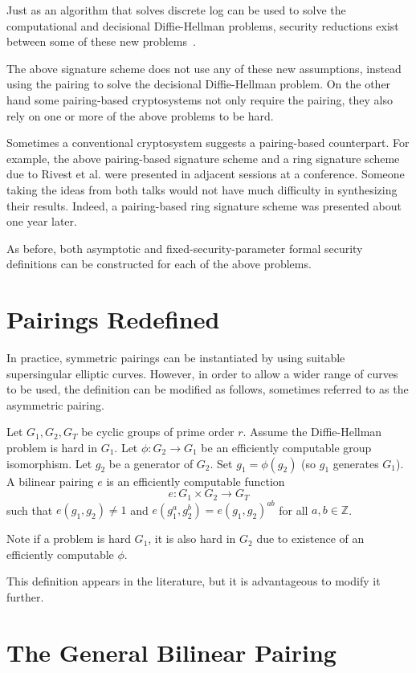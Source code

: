 Just as an algorithm that solves discrete log can be used to solve
the computational and decisional Diffie-Hellman problems, security reductions
exist between some of these new problems~\cite{jouxsurvey}.

The above signature scheme does not use any of these new assumptions,
instead using the pairing to solve the decisional Diffie-Hellman problem.
On the other hand some pairing-based cryptosystems not only require the
pairing, they also rely on one or more of the above problems to be hard.

Sometimes a conventional cryptosystem suggests
a pairing-based counterpart. For example,
the above pairing-based signature scheme and a ring signature scheme
due to Rivest et al. \cite{rst} were presented in adjacent sessions
at a conference. Someone taking the ideas from both talks would not have much
difficulty in synthesizing their results. Indeed,
a pairing-based ring signature scheme was presented about one
year later\cite{bgls}.

As before, both asymptotic and fixed-security-parameter formal security
definitions can be constructed for each of the above problems.

\section{Pairings Redefined}

In practice, symmetric pairings can be instantiated by
using suitable supersingular elliptic curves.
However, in order to allow a wider range of curves to be used,
the definition can be modified as follows, sometimes referred
to as the asymmetric pairing.

Let $G_1, G_2, G_T$ be cyclic groups of prime order $r$.
Assume the Diffie-Hellman problem is hard in $G_1$.
Let $\phi : G_2 \rightarrow G_1$ be an efficiently computable group
isomorphism. Let $g_2$ be a generator of $G_2$.
Set $g_1 = \phi(g_2)$ (so $g_1$ generates $G_1$). 
A bilinear pairing $e$ is an efficiently computable function
\[
e:G_1 \times G_2 \rightarrow G_T
\]
such that $e(g_1,g_2) \ne 1$ and
$e(g_1^a, g_2^b) = e(g_1,g_2)^{a b}$ for all $a, b \in \mathbb{Z}$.

Note if a problem is hard $G_1$, it is also hard in $G_2$
due to existence of an efficiently computable
$\phi$.

This definition appears in the literature, but it is advantageous
to modify it further.

\section{The General Bilinear Pairing}

